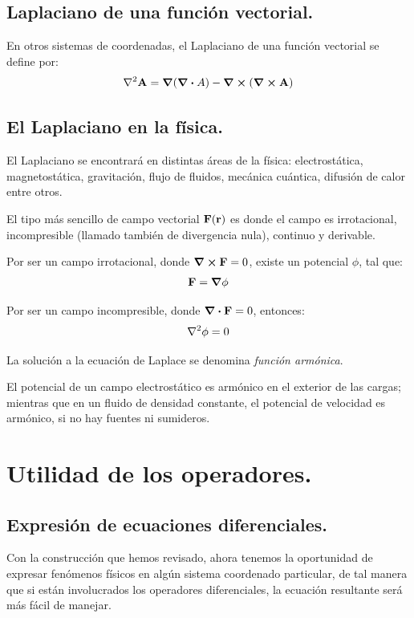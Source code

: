 \documentclass[12pt]{article}
\numberwithin{equation}{section}
\begin{document}
\subsection{Laplaciano de una función vectorial.}

En otros sistemas de coordenadas, el Laplaciano de una función vectorial se define por:
\begin{align*}
\laplacian{\vb{A}} = \grad{(\div{A})} - \curl{(\curl{\vb{A}})}
\end{align*}

\subsection{El Laplaciano en la física.}

El Laplaciano se encontrará en distintas áreas de la física: electrostática, magnetostática, gravitación, flujo de fluidos, mecánica cuántica, difusión de calor entre otros.
\par
El tipo más sencillo de campo vectorial $\vb{F}(\vb{r})$ es donde el campo es irrotacional, incompresible (llamado también de divergencia nula), continuo y derivable.
\par
Por ser un campo irrotacional, donde $\curl{\vb{F}} = 0$, existe un potencial $\phi$, tal que:
\begin{align*}
\vb{F} = \grad{\phi}
\end{align*}

Por ser un campo incompresible, donde $\div{\vb{F}} = 0$, entonces:
\begin{align*}
\laplacian{\phi} = 0
\end{align*}

La solución a la ecuación de Laplace se denomina \emph{función armónica}.
\par
El potencial de un campo electrostático es armónico en el exterior de las cargas; mientras que en un fluido de densidad constante, el potencial de velocidad es armónico, si no hay fuentes ni sumideros.

\section{Utilidad de los operadores.}

\subsection{Expresión de ecuaciones diferenciales.}

Con la construcción que hemos revisado, ahora tenemos la oportunidad de expresar fenómenos físicos en algún sistema coordenado particular, de tal manera que si están involucrados los operadores diferenciales, la ecuación resultante será más fácil de manejar.
\end{document}
